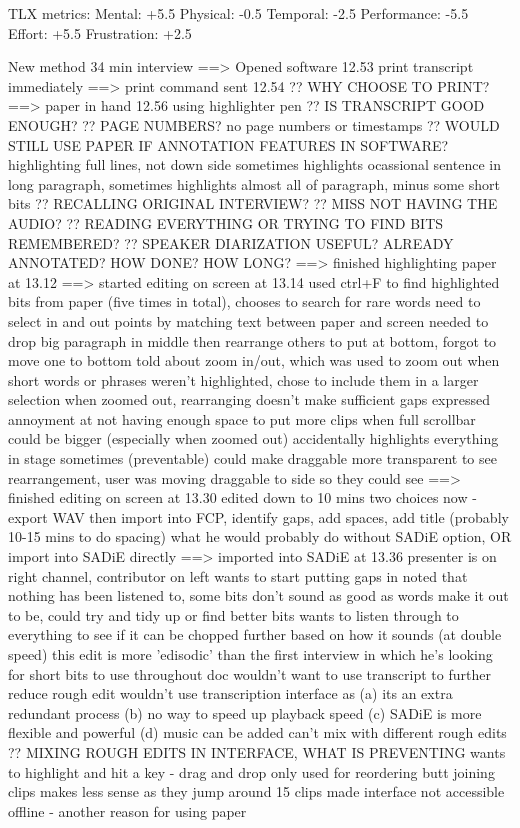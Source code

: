 TLX metrics:
Mental: +5.5
Physical: -0.5
Temporal: -2.5
Performance: -5.5
Effort: +5.5
Frustration: +2.5

New method
34 min interview
==> Opened software 12.53
print transcript immediately
==> print command sent 12.54
?? WHY CHOOSE TO PRINT?
==> paper in hand 12.56
using highlighter pen
?? IS TRANSCRIPT GOOD ENOUGH?
?? PAGE NUMBERS?
no page numbers or timestamps
?? WOULD STILL USE PAPER IF ANNOTATION FEATURES IN SOFTWARE?
highlighting full lines, not down side
sometimes highlights ocassional sentence in long paragraph, sometimes highlights almost all of paragraph, minus some short bits
?? RECALLING ORIGINAL INTERVIEW?
?? MISS NOT HAVING THE AUDIO?
?? READING EVERYTHING OR TRYING TO FIND BITS REMEMBERED?
?? SPEAKER DIARIZATION USEFUL? ALREADY ANNOTATED? HOW DONE? HOW LONG?
==> finished highlighting paper at 13.12
==> started editing on screen at 13.14
used ctrl+F to find highlighted bits from paper (five times in total), chooses to search for rare words
need to select in and out points by matching text between paper and screen
needed to drop big paragraph in middle then rearrange others to put at bottom, forgot to move one to bottom
told about zoom in/out, which was used to zoom out
when short words or phrases weren't highlighted, chose to include them in a larger selection
when zoomed out, rearranging doesn't make sufficient gaps
expressed annoyment at not having enough space to put more clips when full
scrollbar could be bigger (especially when zoomed out)
accidentally highlights everything in stage sometimes (preventable)
could make draggable more transparent to see rearrangement, user was moving draggable to side so they could see
==> finished editing on screen at 13.30
edited down to 10 mins
two choices now - export WAV then import into FCP, identify gaps, add spaces, add title (probably 10-15 mins to do spacing) what he would probably do without SADiE option, OR import into SADiE directly
==> imported into SADiE at 13.36
presenter is on right channel, contributor on left
wants to start putting gaps in
noted that nothing has been listened to, some bits don't sound as good as words make it out to be, could try and tidy up or find better bits
wants to listen through to everything to see if it can be chopped further based on how it sounds (at double speed)
this edit is more 'edisodic' than the first interview in which he's looking for short bits to use throughout doc
wouldn't want to use transcript to further reduce rough edit
wouldn't use transcription interface as (a) its an extra redundant process (b) no way to speed up playback speed (c) SADiE is more flexible and powerful (d) music can be added
can't mix with different rough edits
?? MIXING ROUGH EDITS IN INTERFACE, WHAT IS PREVENTING
wants to highlight and hit a key - drag and drop only used for reordering
butt joining clips makes less sense as they jump around
15 clips made
interface not accessible offline - another reason for using paper

